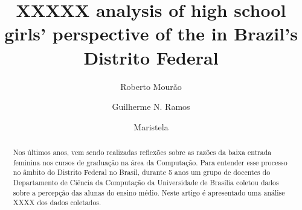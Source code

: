 \documentclass{llncs}
\begin{document}
%
\title{XXXXX analysis of high school girls' perspective of the in Brazil's Distrito Federal}%
%
\author{Roberto Mourão%
\and Guilherme N. Ramos%
\and Maristela}%
%
%

\maketitle%

\begin{abstract}%
Nos últimos anos, vem sendo realizadas reflexões sobre as razões da baixa entrada feminina nos cursos de graduação na área da Computação. Para entender esse processo no âmbito do Distrito Federal no Brasil, durante 5 anos um grupo de docentes do Departamento de Ciência da Computação da Universidade de Brasília coletou dados sobre a percepção das alunas do ensino médio. Neste artigo é apresentado uma análise XXXX dos dados coletados.%

%
\end{abstract}%

%
%
%
%
%

%
%
\end{document}
